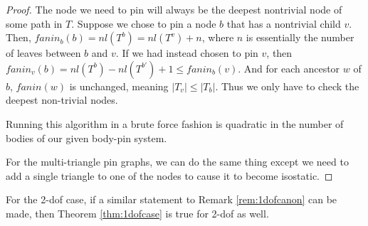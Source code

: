 \begin{proof}

    The node we need to pin will always be the deepest nontrivial node of some path in $T$. Suppose we chose to pin a node $b$ that has a nontrivial child $v$. Then, $fanin_b(b) = nl(T^b) = nl(T^v) + n$, where $n$ is essentially the number of leaves between $b$ and $v$. If we had instead chosen to pin $v$, then $fanin_v(b) = nl(T^b) - nl(T^{b'}) + 1 \leq fanin_b(v)$. And for each ancestor $w$ of $b$, $fanin(w)$ is unchanged, meaning $|T_v| \leq |T_b|$. Thus we only have to check the deepest non-trivial nodes.

    Running this algorithm in a brute force fashion is quadratic in the number of bodies of our given body-pin system.

    For the multi-triangle pin graphs, we can do the same thing except we need to add a single triangle to one of the nodes to cause it to become isostatic.
\end{proof}


\begin{observation}
    For the 2-dof case, if a similar statement to Remark \ref{rem:1dofcanon} can be made, then Theorem \ref{thm:1dofcase} is true for 2-dof as well.
\end{observation}

